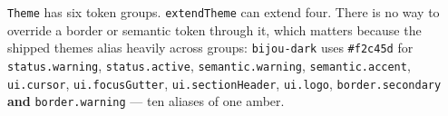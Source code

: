 \texttt{T\allowbreak{}h\allowbreak{}e\allowbreak{}m\allowbreak{}e} has six token groups. \texttt{e\allowbreak{}x\allowbreak{}t\allowbreak{}e\allowbreak{}n\allowbreak{}d\allowbreak{}T\allowbreak{}h\allowbreak{}e\allowbreak{}m\allowbreak{}e} can extend four. There is no way to override a border or semantic token through it, which matters because the shipped themes alias heavily across groups: \texttt{b\allowbreak{}i\allowbreak{}j\allowbreak{}o\allowbreak{}u\allowbreak{}-\allowbreak{}d\allowbreak{}a\allowbreak{}r\allowbreak{}k} uses \texttt{\#\allowbreak{}f\allowbreak{}2\allowbreak{}c\allowbreak{}4\allowbreak{}5\allowbreak{}d} for \texttt{s\allowbreak{}t\allowbreak{}a\allowbreak{}t\allowbreak{}u\allowbreak{}s\allowbreak{}.\allowbreak{}w\allowbreak{}a\allowbreak{}r\allowbreak{}n\allowbreak{}i\allowbreak{}n\allowbreak{}g}, \texttt{s\allowbreak{}t\allowbreak{}a\allowbreak{}t\allowbreak{}u\allowbreak{}s\allowbreak{}.\allowbreak{}a\allowbreak{}c\allowbreak{}t\allowbreak{}i\allowbreak{}v\allowbreak{}e}, \texttt{s\allowbreak{}e\allowbreak{}m\allowbreak{}a\allowbreak{}n\allowbreak{}t\allowbreak{}i\allowbreak{}c\allowbreak{}.\allowbreak{}w\allowbreak{}a\allowbreak{}r\allowbreak{}n\allowbreak{}i\allowbreak{}n\allowbreak{}g}, \texttt{s\allowbreak{}e\allowbreak{}m\allowbreak{}a\allowbreak{}n\allowbreak{}t\allowbreak{}i\allowbreak{}c\allowbreak{}.\allowbreak{}a\allowbreak{}c\allowbreak{}c\allowbreak{}e\allowbreak{}n\allowbreak{}t}, \texttt{u\allowbreak{}i\allowbreak{}.\allowbreak{}c\allowbreak{}u\allowbreak{}r\allowbreak{}s\allowbreak{}o\allowbreak{}r}, \texttt{u\allowbreak{}i\allowbreak{}.\allowbreak{}f\allowbreak{}o\allowbreak{}c\allowbreak{}u\allowbreak{}s\allowbreak{}G\allowbreak{}u\allowbreak{}t\allowbreak{}t\allowbreak{}e\allowbreak{}r}, \texttt{u\allowbreak{}i\allowbreak{}.\allowbreak{}s\allowbreak{}e\allowbreak{}c\allowbreak{}t\allowbreak{}i\allowbreak{}o\allowbreak{}n\allowbreak{}H\allowbreak{}e\allowbreak{}a\allowbreak{}d\allowbreak{}e\allowbreak{}r}, \texttt{u\allowbreak{}i\allowbreak{}.\allowbreak{}l\allowbreak{}o\allowbreak{}g\allowbreak{}o}, \texttt{b\allowbreak{}o\allowbreak{}r\allowbreak{}d\allowbreak{}e\allowbreak{}r\allowbreak{}.\allowbreak{}s\allowbreak{}e\allowbreak{}c\allowbreak{}o\allowbreak{}n\allowbreak{}d\allowbreak{}a\allowbreak{}r\allowbreak{}y} \textbf{and} \texttt{b\allowbreak{}o\allowbreak{}r\allowbreak{}d\allowbreak{}e\allowbreak{}r\allowbreak{}.\allowbreak{}w\allowbreak{}a\allowbreak{}r\allowbreak{}n\allowbreak{}i\allowbreak{}n\allowbreak{}g} --- ten aliases of one amber.

